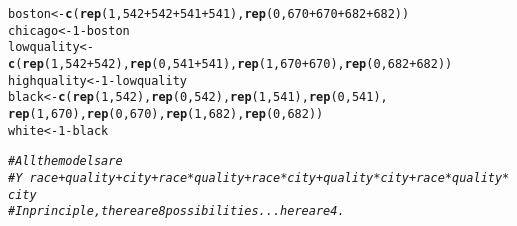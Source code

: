\documentclass[11pt,notitlepage]{article}\usepackage[]{graphicx}\usepackage[]{color}
\makeatletter
\newcommand{\hlnum}[1]{\textcolor[rgb]{0.686,0.059,0.569}{#1}}%
\newcommand{\hlcom}[1]{\textcolor[rgb]{0.678,0.584,0.686}{\textit{#1}}}%
\newcommand{\hlopt}[1]{\textcolor[rgb]{0,0,0}{#1}}%
\newcommand{\hlstd}[1]{\textcolor[rgb]{0.345,0.345,0.345}{#1}}%
\newcommand{\hlkwb}[1]{\textcolor[rgb]{0.69,0.353,0.396}{#1}}%
\newcommand{\hlkwd}[1]{\textcolor[rgb]{0.737,0.353,0.396}{\textbf{#1}}}%
\newenvironment{kframe}{%
 \def\at@end@of@kframe{}%
 \ifinner\ifhmode%
  \def\at@end@of@kframe{\end{minipage}}%
  \begin{minipage}{\columnwidth}%
 \fi\fi%
 \def\FrameCommand##1{\hskip\@totalleftmargin \hskip-\fboxsep
 \colorbox{shadecolor}{##1}\hskip-\fboxsep
     \hskip-\linewidth \hskip-\@totalleftmargin \hskip\columnwidth}%
 \MakeFramed {\advance\hsize-\width
   \@totalleftmargin\z@ \linewidth\hsize
   \@setminipage}}%
 {\par\unskip\endMakeFramed%
 \at@end@of@kframe}
\makeatother
\begin{document}
\begin{enumerate}[a)]
\begin{kframe}
\begin{alltt}
\hlstd{boston} \hlkwb{<-} \hlkwd{c}\hlstd{(}\hlkwd{rep}\hlstd{(}\hlnum{1}\hlstd{,} \hlnum{542}\hlopt{+}\hlnum{542}\hlopt{+}\hlnum{541}\hlopt{+}\hlnum{541}\hlstd{),} \hlkwd{rep}\hlstd{(}\hlnum{0}\hlstd{,} \hlnum{670}\hlopt{+}\hlnum{670}\hlopt{+}\hlnum{682}\hlopt{+}\hlnum{682}\hlstd{))}
\hlstd{chicago} \hlkwb{<-} \hlnum{1}\hlopt{-}\hlstd{boston}
\hlstd{lowquality} \hlkwb{<-} \hlkwd{c}\hlstd{(}\hlkwd{rep}\hlstd{(}\hlnum{1}\hlstd{,} \hlnum{542}\hlopt{+}\hlnum{542}\hlstd{),} \hlkwd{rep}\hlstd{(}\hlnum{0}\hlstd{,} \hlnum{541}\hlopt{+}\hlnum{541}\hlstd{),} \hlkwd{rep}\hlstd{(}\hlnum{1}\hlstd{,} \hlnum{670}\hlopt{+}\hlnum{670}\hlstd{),} \hlkwd{rep}\hlstd{(}\hlnum{0}\hlstd{,} \hlnum{682}\hlopt{+}\hlnum{682}\hlstd{))}
\hlstd{highquality} \hlkwb{<-} \hlnum{1}\hlopt{-}\hlstd{lowquality}
\hlstd{black}\hlkwb{<-} \hlkwd{c}\hlstd{(}\hlkwd{rep}\hlstd{(}\hlnum{1}\hlstd{,} \hlnum{542}\hlstd{),} \hlkwd{rep}\hlstd{(}\hlnum{0}\hlstd{,}\hlnum{542}\hlstd{),} \hlkwd{rep}\hlstd{(}\hlnum{1}\hlstd{,} \hlnum{541}\hlstd{),} \hlkwd{rep}\hlstd{(}\hlnum{0}\hlstd{,}\hlnum{541}\hlstd{),}
          \hlkwd{rep}\hlstd{(}\hlnum{1}\hlstd{,} \hlnum{670}\hlstd{),} \hlkwd{rep}\hlstd{(}\hlnum{0}\hlstd{,}\hlnum{670}\hlstd{),} \hlkwd{rep}\hlstd{(}\hlnum{1}\hlstd{,} \hlnum{682}\hlstd{),} \hlkwd{rep}\hlstd{(}\hlnum{0}\hlstd{,}\hlnum{682}\hlstd{))}
\hlstd{white} \hlkwb{<-} \hlnum{1}\hlopt{-}\hlstd{black}

\hlcom{# All the models are}
\hlcom{# Y ~ race + quality + city + race*quality + race*city + quality*city + race*quality*city}
\hlcom{# In principle, there are 8 possibilities... here are 4.}


\end{alltt}
\end{kframe}
\end{enumerate}
\end{document}

